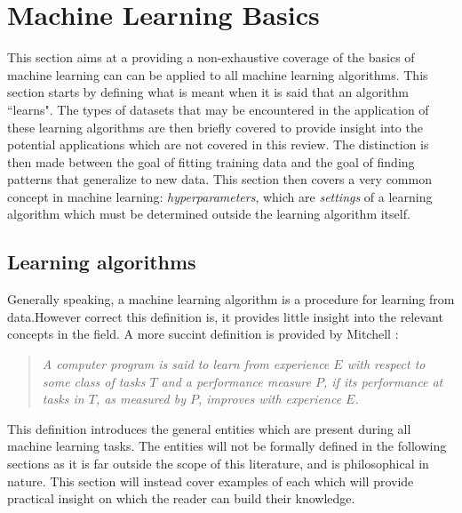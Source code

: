 \newpage


\section{Machine Learning Basics}
This section aims at a providing a non-exhaustive coverage of the basics of
machine learning can can be applied to all machine learning algorithms. This
section starts by defining what is meant when it is said that an algorithm
``learns". The types of datasets that may be encountered in the application of
these learning algorithms are then briefly covered to provide insight into the
potential applications which are not covered in this review. The distinction is
then made between the goal of fitting training data and the goal of finding
patterns that generalize to new data. This section then covers a very common
concept in machine learning: \textit{hyperparameters}, which are
\textit{settings} of a learning algorithm which must be determined outside the
learning algorithm itself.

\subsection{Learning algorithms}
Generally speaking, a machine learning algorithm is a procedure for learning
from data.However correct this definition is, it provides little insight into
the relevant concepts in the field. A more succint definition is provided by
Mitchell \cite{Mitchell97LearningAlgorithm}:
\begin{quotation}
    \textit{A computer program is said to learn from experience $E$ with respect
    to some class of tasks $T$ and a performance measure $P$, if its performance
    at tasks in $T$, as measured by $P$, improves with experience $E$.}
\end{quotation}
This definition introduces the general entities which are present during all
machine learning tasks. The entities will not be formally defined in the
following sections as it is far outside the scope of this literature, and is
philosophical in nature. This section will instead cover examples of each which
will provide practical insight on which the reader can build their knowledge.

